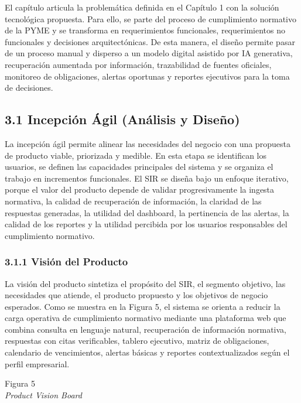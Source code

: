 \documentclass[12pt,a4paper,oneside]{report}
\begin{document}
El capítulo articula la problemática definida en el Capítulo 1 con la
solución tecnológica propuesta. Para ello, se parte del proceso de
cumplimiento normativo de la PYME y se transforma en requerimientos
funcionales, requerimientos no funcionales y decisiones arquitectónicas.
De esta manera, el diseño permite pasar de un proceso manual y disperso
a un modelo digital asistido por IA generativa, recuperación aumentada
por información, trazabilidad de fuentes oficiales, monitoreo de
obligaciones, alertas oportunas y reportes ejecutivos para la toma de
decisiones.

\subsection{3.1 Incepción Ágil (Análisis y
Diseño)}\label{incepciuxf3n-uxe1gil-anuxe1lisis-y-diseuxf1o}

La incepción ágil permite alinear las necesidades del negocio con una
propuesta de producto viable, priorizada y medible. En esta etapa se
identifican los usuarios, se definen las capacidades principales del
sistema y se organiza el trabajo en incrementos funcionales. El SIR se
diseña bajo un enfoque iterativo, porque el valor del producto depende
de validar progresivamente la ingesta normativa, la calidad de
recuperación de información, la claridad de las respuestas generadas, la
utilidad del dashboard, la pertinencia de las alertas, la calidad de los
reportes y la utilidad percibida por los usuarios responsables del
cumplimiento normativo.

\subsubsection{3.1.1 Visión del Producto}\label{visiuxf3n-del-producto}

La visión del producto sintetiza el propósito del SIR, el segmento
objetivo, las necesidades que atiende, el producto propuesto y los
objetivos de negocio esperados. Como se muestra en la Figura 5, el
sistema se orienta a reducir la carga operativa de cumplimiento
normativo mediante una plataforma web que combina consulta en lenguaje
natural, recuperación de información normativa, respuestas con citas
verificables, tablero ejecutivo, matriz de obligaciones, calendario de
vencimientos, alertas básicas y reportes contextualizados según el
perfil empresarial.

\label{_Toc231672405}{}Figura 5\\
\emph{Product Vision Board}
\end{document}
